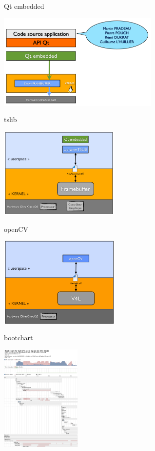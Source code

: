 \documentclass[11pt]{beamer}
\begin{document}
	\begin{frame}[label=Qt]{Qt embedded}
	\begin{center}
			  \includegraphics[width=8cm]{common/Qt_arch.png}
		\end{center}
		\hyperlink{pageQt}{}
	\end{frame}
	
	\begin{frame}[label=tslib]{tslib}
	\begin{center}
			  \includegraphics[width=6cm]{common/tslib.png}
		\end{center}
		\hyperlink{pageQt2}{}
	\end{frame}
	
	\begin{frame}[label=openCV]{openCV}
			\begin{center}
			  \includegraphics[width=6cm]{common/v4l.png}
		\end{center}
		\hyperlink{pageopenCV}{}
	\end{frame}
	
	\begin{frame}[label=bootchart]{bootchart}
			\begin{center}
			  \includegraphics[width=4cm]{common/bootchart.png}
		\end{center}
		\hyperlink{optimisation}{}
	\end{frame}
\end{document}

